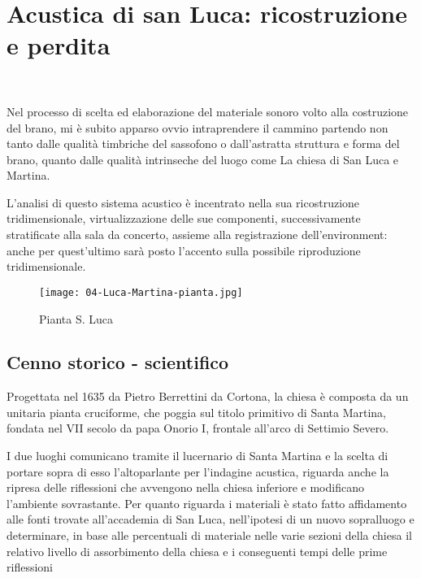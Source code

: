 
\chapter{Acustica di san Luca: ricostruzione e perdita}
\label{cap:acustica}


~
\vfill

Nel processo di scelta ed elaborazione del materiale sonoro volto alla costruzione del brano,
mi è subito apparso ovvio intraprendere il cammino partendo non tanto dalle qualità timbriche
del sassofono o dall'astratta struttura e forma del brano, quanto dalle qualità intrinseche
del luogo come La chiesa di San Luca e Martina.

L'analisi di questo sistema acustico è incentrato nella sua ricostruzione tridimensionale,
virtualizzazione delle sue componenti, successivamente stratificate alla sala da concerto,
assieme alla registrazione dell'environment: anche per quest'ultimo sarà posto l'accento
sulla possibile riproduzione tridimensionale.

\begin{figure}[h]
\centering
{\texttt{[image: 04-Luca-Martina-pianta.jpg]}}
\caption[Pianta S. Luca]{Pianta S. Luca}
\label{fig:tetratetra}
\end{figure}

\clearpage

\section{Cenno storico - scientifico}
\label{sec:storico}

Progettata nel 1635 da Pietro Berrettini da Cortona, la chiesa è composta da un unitaria
pianta cruciforme, che poggia sul titolo primitivo di Santa Martina, fondata nel VII
secolo da papa Onorio I, frontale all'arco di Settimio Severo. 

I due luoghi comunicano tramite il lucernario di Santa Martina e la scelta  di portare sopra
di esso l'altoparlante per l'indagine acustica, riguarda anche la ripresa delle riflessioni 
che avvengono nella chiesa inferiore e modificano l'ambiente sovrastante.
Per quanto riguarda i materiali è stato fatto affidamento alle fonti trovate all'accademia
di San Luca, nell'ipotesi di un nuovo sopralluogo e determinare, in base alle percentuali
di materiale nelle varie sezioni della chiesa il relativo livello di assorbimento della
chiesa e i conseguenti tempi delle prime  riflessioni

